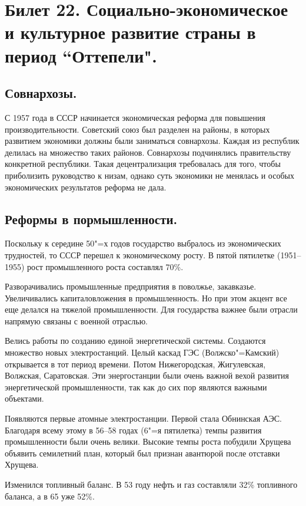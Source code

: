 \section{Билет 22. Социально-экономическое и культурное развитие страны в период “Оттепели".}

\subsection{Совнархозы.}

С 1957 года в СССР начинается экономическая реформа для повышения производительности. Советский союз был разделен на районы, в которых развитием экономики должны были заниматься совнархозы. Каждая из республик делилась на множество таких районов. Совнархозы подчинялись правительству конкретной республики. Такая децентрализация требовалась для того, чтобы приболизить руководство к низам, однако суть экономики не менялась и особых экономических результатов реформа не дала.

\subsection{Реформы в пормышленности.}

Поскольку к середине 50"=х годов государство выбралось из экономических трудностей, то СССР перешел к экономическому росту. В пятой пятилетке (1951--1955) рост промышленного роста составлял 70\%. 

Разворачивались промышленные предприятия в поволжье, закавказье. Увеличивались капиталовложения в промышленность. Но при этом акцент все еще делался на тяжелой промышленности. Для государства важнее были отрасли напрямую связаны с военной отраслью. 

Велись работы по созданию единой энергетической системы. Создаются множество новых электростанций. Целый каскад ГЭС (Волжско"=Камский) открывается в тот период времени. Потом Нижегородская, Жигулевская, Волжская, Саратовская. Эти энергостанции были очень важной вехой развития энергетической промышленности, так как до сих пор являются важными объектами. 

Появляются первые атомные электростанции. Первой стала Обнинская АЭС. Благодаря всему этому в 56--58 годах (6"=я пятилетка) темпы развития промышленности были очень велики. Высокие темпы роста побудили Хрущева объявить семилетний план, который был признан авантюрой после отставки Хрущева.

Изменился топливный баланс. В 53 году нефть и газ составляли 32\% топливного баланса, а в 65 уже 52\%. 

